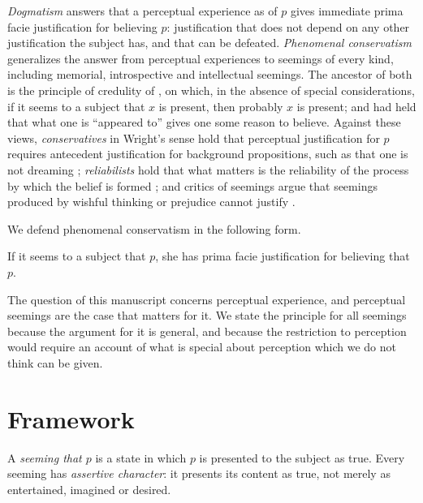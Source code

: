 \documentclass{situationist-preprint}
\begin{document}
\emph{Dogmatism} \citep{Pryor2000} answers that a perceptual experience as of $p$ gives immediate prima facie justification for believing $p$: justification that does not depend on any other justification the subject has, and that can be defeated. \emph{Phenomenal conservatism} \citep{Huemer2001,Huemer2007} generalizes the answer from perceptual experiences to seemings of every kind, including memorial, introspective and intellectual seemings. The ancestor of both is the principle of credulity of \citet{Swinburne1979}, on which, in the absence of special considerations, if it seems to a subject that $x$ is present, then probably $x$ is present; and \citet{Chisholm1966} had held that what one is \enquote{appeared to} gives one some reason to believe. Against these views, \emph{conservatives} in Wright's sense hold that perceptual justification for $p$ requires antecedent justification for background propositions, such as that one is not dreaming \citep{Wright2004}; \emph{reliabilists} hold that what matters is the reliability of the process by which the belief is formed \citep{Goldman1979,Bergmann2013}; and critics of seemings argue that seemings produced by wishful thinking or prejudice cannot justify \citep{Markie2005,Siegel2012}.

We defend phenomenal conservatism in the following form.

\begin{principle}\label{p:pc}
If it seems to a subject that $p$, she has prima facie justification for believing that $p$.
\end{principle}

The question of this manuscript concerns perceptual experience, and perceptual seemings are the case that matters for it. We state the principle for all seemings because the argument for it is general, and because the restriction to perception would require an account of what is special about perception which we do not think can be given.

\section{Framework}

\begin{definition}[Seeming]\label{d:seeming}
A \emph{seeming that $p$} is a state in which $p$ is presented to the subject as true. Every seeming has \emph{assertive character}: it presents its content as true, not merely as entertained, imagined or desired.
\end{definition}
\end{document}

